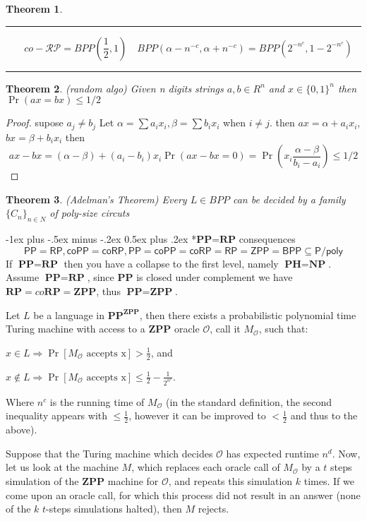 \documentclass[10pt,landscape]{article}
\makeatletter
\theoremstyle{plain}%
\newtheorem*{thm}{Theorem}
\theoremstyle{definition}
\theoremstyle{remark}
\renewcommand{\section}{\@startsection{section}{1}{0mm}%
                                {-1ex plus -.5ex minus -.2ex}%
                                {0.5ex plus .2ex}%
                                {\normalfont\large\bfseries}}
\makeatother
\begin{document}
\begin{multicols}{3}
\begin{thm}
\end{thm}
\hrule
\[ \quad co-\mathcal{RP}=BPP(\frac{1}{2},1)\quad BPP(\alpha-n^{-c},\alpha +n^{-c})=BPP(2^{{-n}^c},1-2^{{-n}^c})\]
\hrule

\begin{thm}(random algo) Given n digits strings $a,b\in R^n$ and $x\in \{0,1\}^n$ then $  \Pr(ax=bx)\le 1/2$


\end{thm}
\begin{proof}
supose $a_j\neq b_j$ Let $\alpha=\sum a_ix_i,\beta=\sum b_ix_i$ when $i\neq j$. then $ax=\alpha+a_ix_i$, $bx=\beta +b_ix_i$ then
\[ ax - bx = ( \alpha-\beta )+(a_i- b_i) x_i  \Pr(ax - bx=0)= \Pr  \left(x_i \frac{\alpha -\beta}{b_i-a_i}\right)\le 1/2
\]
\end{proof}
\begin{thm}(Adelman’s Theorem) Every $L\in BPP$ can be decided by a family $\{C_n\}_{n\in N}$ of poly-size circuts
\end{thm}
\section*{$\textbf{PP=RP}$ consequences}
$$\mathsf{PP=RP},\mathsf{coPP=coRP},\mathsf{PP=coPP=coRP=RP=ZPP=BPP\subseteq P/poly}$$
If $\textbf{PP}=\textbf{RP}$ then you have a collapse to the first level, namely $\textbf{PH}=\textbf{NP}$.
Assume $\textbf{PP}=\textbf{RP}$, since $\textbf{PP}$ is closed under complement we have $\textbf{RP}=co{\textbf{RP}}=\textbf{ZPP}$, thus $\textbf{PP}=\textbf{ZPP}$.

Let $L$ be a language in $\textbf{PP}^{\textbf{ZPP}}$, then there exists a probabilistic polynomial time Turing machine with access to a $\textbf{ZPP}$ oracle $\mathcal{O}$, call it $M_{\mathcal{O}}$, such that:

$x\in L\Rightarrow \Pr\left[M_{\mathcal{O}} \text{ accepts x}\right]>\frac{1}{2}$, and

$x\notin L\Rightarrow \Pr\left[M_{\mathcal{O}} \text{ accepts x}\right]\le\frac{1}{2}-\frac{1}{2^{n^c}}$.

Where $n^c$ is the running time of $M_{\mathcal{O}}$ (in the standard definition, the second inequality appears with $\le\frac{1}{2}$, however it can be improved to $<\frac{1}{2}$ and thus to the above).


Suppose that the Turing machine which decides $\mathcal{O}$ has expected runtime $n^d$. Now, let us look at the machine $M$, which replaces each oracle call of $M_{\mathcal{O}}$ by a $t$ steps simulation of the $\textbf{ZPP}$ machine for $\mathcal{O}$, and repeats this simulation $k$ times. If we come upon an oracle call, for which this process did not result in an answer (none of the $k$ $t$-steps simulations halted), then $M$ rejects.


\end{multicols}
\end{document}
